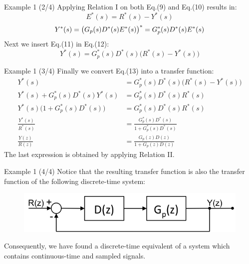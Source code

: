 \begin{frame}
	\begin{exampleblock}{Example 1 (2/4)}
		Applying Relation I on both Eq.(9) and Eq.(10) results in:
		\begin{equation}
		E^{*}(s) = R^{*}(s) - Y^{*}(s)
		\end{equation}
		\begin{equation}
		Y^{*}(s) = \big ( G_p(s)D^{*}(s)E^{*}(s) \big )^{*} = G_p^{*}(s)D^{*}(s)E^{*}(s)
		\vspace{1.5em}
		\end{equation}
		Next we insert Eq.(11) in Eq.(12):
		\begin{equation}
		Y^{*}(s) = G_p^{*}(s)D^{*}(s) \big ( R^{*}(s) - Y^{*}(s) \big)
		\end{equation}
	\end{exampleblock}
\end{frame}

\begin{frame}
	\begin{exampleblock}{Example 1 (3/4)}
		Finally we convert Eq.(13) into a transfer function:
		\begin{align*}
		Y^{*}(s) &= G_p^{*}(s)D^{*}(s) \big ( R^{*}(s) - Y^{*}(s) \big)\\
		Y^{*}(s) + G_p^{*}(s)D^{*}(s)Y^{*}(s) &= G_p^{*}(s)D^{*}(s)R^{*}(s)\\
		Y^{*}(s) \big (1 +  G_p^{*}(s)D^{*}(s) \big) &= G_p^{*}(s)D^{*}(s)R^{*}(s)\\
		\frac{Y^{*}(s)}{R^{*}(s)} &= \frac{G_p^{*}(s)D^{*}(s)}{1 +  G_p^{*}(s)D^{*}(s)}\\
		\frac{Y(z)}{R(z)} &= \frac{G_p(z)D(z)}{1 +  G_p(z)D(z)}
		\end{align*}
		The last expression is obtained by applying Relation II.
	\end{exampleblock}
\end{frame}

\begin{frame}
	\begin{exampleblock}{Example 1 (4/4)}
		\justify		
		Notice that the resulting transfer function is also the transfer function of the following discrete-time system:
		\begin{figure}
			\centering
			\includegraphics[width=0.8\linewidth]{block_analysis_3}
		\end{figure}
		Consequently, we have found a discrete-time equivalent of a system which contains continuous-time and sampled signals.
	\end{exampleblock}
\end{frame}

